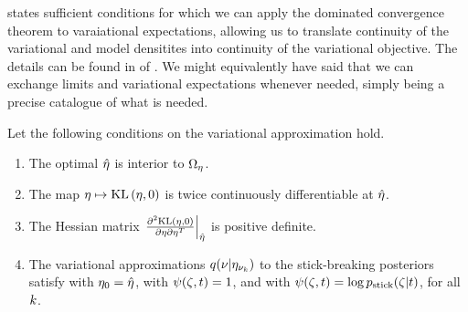  states sufficient conditions for which we can apply the
dominated convergence theorem to varaiational expectations, allowing us to
translate continuity of the variational and model densitites into continuity of
the variational objective.  The details can be found in  of .  We might equivalently have said that
we can exchange limits and variational expectations whenever needed,
 simply being a precise catalogue of what is needed.


\begin{assu}
%
Let the following conditions on the variational approximation hold.
%
\begin{enumerate}
%
    \item {} The optimal $\hat\eta$ is interior
    to $\Omega_{\eta}$.

    \item {} The map $\eta \mapsto \mathrm{KL}\left(\eta, 0\right)$ is twice
    continuously differentiable at $\hat\eta$.

    \item{} The Hessian matrix $\left.\frac{\partial^2 \mathrm{KL}\left(\eta,
    0\right)}{\partial \eta \partial \eta^T}\right\vert_{\hat\eta}$ is positive definite.

    \item{} The variational approximations $q(\nu
    \vert \eta_{\nu_{k}})$ to the stick-breaking posteriors satisfy
     with $\eta_0 = \hat\eta$, with $\psi(\zeta, t) = 1$,
    and with $\psi(\zeta, t) = \log p_{\mathrm{stick}}(\zeta \vert t)$, for all $k$.
%
\end{enumerate}
%
\end{assu}

